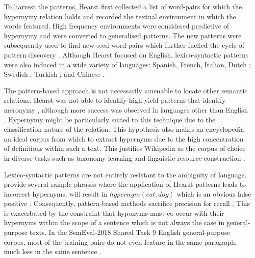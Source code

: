 To harvest the patterns, Hearst first collected a list of word-pairs for which the hypernymy relation holds and recorded the textual environment in which the words featured.  High frequency environments were considered predictive of hypernymy and were converted to generalised patterns.  The new patterns were subsequently used to find new seed word-pairs which further fuelled the cycle of pattern discovery \citep{hearst1992automatic}.  Although Hearst focused on English, lexico-syntactic patterns were also induced in a wide variety of languages: Spanish, French, Italian, Dutch \citep{faralli2018misa}; Swedish \citep{rydin2002building}; Turkish \citep{sahin2016extraction}; and Chinese \citep{Fu2014}.

The pattern-based approach is not necessarily amenable to locate other semantic relations.  Hearst was not able to identify high-yield patterns that identify meronymy \citep{hearst1992automatic}, although more success was observed in languages other than English \citep{sahin2017}.  Hypernymy might be particularly suited to this technique due to the classification nature of the relation.  This hypothesis also makes an encyclopedia an ideal corpus from which to extract hypernyms due to the high concentration of definitions within such a text.    This justifies Wikipedia as the corpus of choice in diverse tasks such as taxonomy learning \citep{bordea2016semeval} and linguistic resource construction \citep{Flati2016, Baroni2011}.  

Lexico-syntactic patterns are not entirely resistant to the ambiguity of language.  \citet{wu2012probase} provide several sample phrases where the application of Hearst patterns leads to incorrect hypernyms.   will result in \(hypernym(cat, dog)\) which is an obvious false positive \citep{wu2012probase}.  Consequently, pattern-based methods sacrifice precision for recall \citep{Wang2017, Snow2004, ritter2009anyway}.  This is exacerbated by the constraint that hyponyms must co-occur with their hypernyms within the scope of a sentence which is not always the case in general-purpose texts.  In the SemEval-2018 Shared Task 9 \citep{camacho2018semeval} English general-purpose corpus, most of the training pairs do not even feature in the same paragraph, much less in the same sentence \citep{bernier2018crim}.

